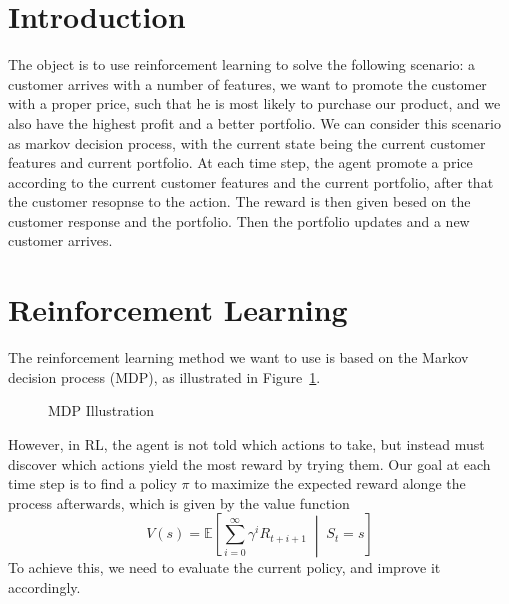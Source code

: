 \documentclass[balance,upint,subscriptcorrection,varvw,mathalfa=cal=boondoxo,pdf-a,colorlinks,nofoot]{asmeconf}
\begin{document}
\section{Introduction}
\noindent The object is to use reinforcement learning to solve the following scenario:
a customer arrives with a number of features, we want to promote the customer
with a proper price, such that he is most likely to purchase our product, and 
we also have the highest profit and a better portfolio. 
\vspace{3mm}\newline We can consider this scenario as markov decision process,
with the current state being the current customer features and current 
portfolio. At each time step, the agent promote a price according to the 
current customer features and the current portfolio, after that the customer 
resopnse to the action. The reward is then given besed on the customer 
response and the portfolio. Then the portfolio updates and a new customer 
arrives.

\section{Reinforcement Learning}
\noindent The reinforcement learning method we want to use is based on the Markov 
decision process (MDP), as illustrated in Figure~\ref{fig:MDP-illustration}.
\begin{figure}
    \centering
    \caption{MDP Illustration}
    \label{fig:MDP-illustration}
\end{figure}
\noindent However, in RL, the agent is not told which actions to take, but 
instead must discover which actions yield the most reward by trying them. Our 
goal at each time step is to find a policy \(\pi\) to maximize the expected 
reward alonge the process afterwards, which is given by the value function
\[V(s)=\mathbb{E}\left[\sum_{i=0}^{\infty} \gamma^i R_{t+i+1}\;\middle|\; 
S_t=s\right]\]
To achieve this, we need to evaluate the current policy, and improve it 
accordingly.
\end{document}
